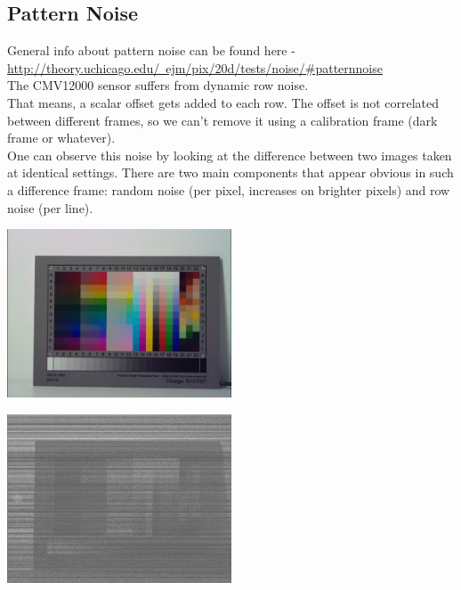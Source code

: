{    

\subsection{Pattern Noise}

General info about pattern noise can be found here - \href{http://theory.uchicago.edu/~ejm/pix/20d/tests/noise/#patternnoise}{http://theory.uchicago.edu/~ejm/pix/20d/tests/noise/#patternnoise} \\

The CMV12000 sensor suffers from dynamic row noise.\\

That means, a scalar offset gets added to each row. The offset is not correlated between different frames, so we can't remove it using a calibration frame (dark frame or whatever).\\

One can observe this noise by looking at the difference between two images taken at identical settings. There are two main components that appear obvious in such a difference frame: random noise (per pixel, increases on brighter pixels) and row noise (per line). \\

\begin{center}
\includegraphics[height=5cm]{images/it8-gainx1-offset2047-20ms-01}
\end{center}

\begin{center}
\includegraphics[height=5cm]{images/it8-gainx1-offset2047-20ms-01-minus-02-small}
\end{center}




}
